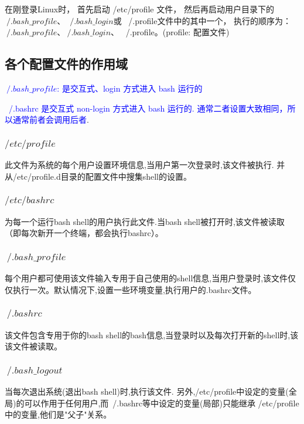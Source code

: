 在刚登录Linux时，
首先启动 /etc/profile 文件，
然后再启动用户目录下的$ ~/.bash\_profile$、
$~/.bash\_login$或 
~/.profile文件中的其中一个，
执行的顺序为：$ ~/.bash\_profile$、$~/.bash\_login$、 ~/.profile。(profile: 配置文件)



\subsection{各个配置文件的作用域}
\textcolor{blue}{$~/.bash\_profile$: 是交互式、login 方式进入 bash 运行的} \par
\textcolor{blue}{~/.bashrc 是交互式 non-login 方式进入 bash 运行的. 通常二者设置大致相同，所以通常前者会调用后者}.
\subsubsection{$/etc/profile$}
此文件为系统的每个用户设置环境信息,当用户第一次登录时,该文件被执行. 并从/etc/profile.d目录的配置文件中搜集shell的设置。

\subsubsection{$/etc/bashrc$}
为每一个运行bash shell的用户执行此文件.当bash shell被打开时,该文件被读取（即每次新开一个终端，都会执行bashrc）。

\subsubsection{$~/.bash\_profile$}
每个用户都可使用该文件输入专用于自己使用的shell信息,当用户登录时,该文件仅仅执行一次。默认情况下,设置一些环境变量,执行用户的.bashrc文件。

\subsubsection{$~/.bashrc$}
该文件包含专用于你的bash shell的bash信息,当登录时以及每次打开新的shell时,该该文件被读取。

\subsubsection{$~/.bash\_logout$}
当每次退出系统(退出bash shell)时,执行该文件. 另外,/etc/profile中设定的变量(全局)的可以作用于任何用户,而~/.bashrc等中设定的变量(局部)只能继承 /etc/profile中的变量,他们是"父子"关系。



